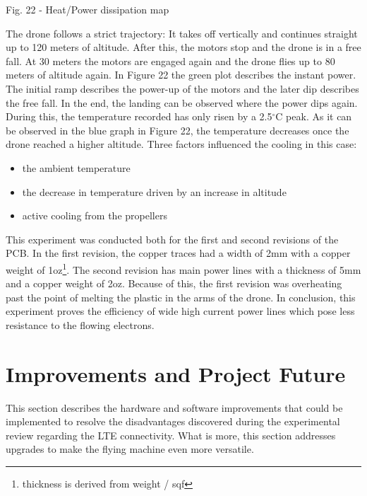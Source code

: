 \documentclass{IEEEtran}
\begin{document}
\begin{it}\begin{center}Fig. 22 - Heat/Power dissipation map \end{center}\end{it}
The drone follows a strict trajectory: It takes off vertically and continues straight up to 120 meters of altitude. After this, the motors stop and the drone is in a free fall. At 30 meters the motors are engaged again and the drone flies up to 80 meters of altitude again. In Figure 22 the green plot describes the instant power. The initial ramp describes the power-up of the motors and the later dip describes the free fall. In the end, the landing can be observed where the power dips again. During this, the temperature recorded has only risen by a 2.5$^{\circ}$C peak. As it can be observed in the blue graph in Figure 22, the temperature decreases once the drone reached a higher altitude. Three factors influenced the cooling in this case: 
\begin{itemize}
    \item the ambient temperature
    \item the decrease in temperature driven by an increase in altitude
    \item active cooling from the propellers
\end{itemize}
This experiment was conducted both for the first and second revisions of the PCB. In the first revision, the copper traces had a width of 2mm with a copper weight of 1oz\footnote{thickness is derived from weight / sqf}. The second revision has main power lines with a thickness of 5mm and a copper weight of 2oz. Because of this, the first revision was overheating past the point of melting the plastic in the arms of the drone.
In conclusion, this experiment proves the efficiency of wide high current power lines which pose less resistance to the flowing electrons.

\section{Improvements and Project Future}
This section describes the hardware and software improvements that could be implemented to resolve the disadvantages discovered during the experimental review regarding the LTE connectivity. What is more, this section addresses upgrades to make the flying machine even more versatile.
\end{document}
